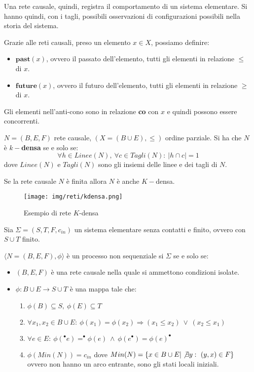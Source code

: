 Una rete causale, quindi, registra il comportamento di un sistema elementare. Si hanno quindi, con i tagli, possibili osservazioni di configurazioni possibili nella storia del sistema.
\begin{definizione}
    Grazie alle reti causali, preso un elemento $x \in X$, possiamo definire:
    \begin{itemize}
        \item $\textbf{past}(x)$, ovvero il passato dell'elemento, tutti gli elementi in relazione $\leq$ di $x$.
        \item $\textbf{future}(x)$, ovvero il futuro dell'elemento, tutti gli elementi in relazione $\geq$ di $x$.
    \end{itemize}
    Gli elementi nell'anti-cono sono in relazione \textbf{co} con $x$ e quindi possono essere concorrenti.
\end{definizione}
\begin{definizione}
    $N = (B, E, F)$ rete causale, $(X = (B \cup E), \leq)$ ordine parziale. Si ha che $N$ è \textbf{$k-$densa} se e solo se:
    \begin{equation}
        \forall h \in Linee(N), \ \forall c \in Tagli(N): \ |h \cap c| = 1 
    \end{equation}
    dove $Linee(N)$ e $Tagli(N)$ sono gli insiemi delle linee e dei tagli di $N$.
\end{definizione}
\begin{nota}
    Se la rete causale $N$ è finita allora $N$ è anche $K-$densa.
\end{nota}
\begin{figure}[!ht]
    \centering
    \texttt{[image: img/reti/kdensa.png]}
    \caption{Esempio di rete $K$-densa}
\end{figure}
\begin{definizione}
    Sia $\Sigma = (S, T, F, c_{in})$ un sistema elementare senza contatti e finito, ovvero con $S \cup T$ finito.

    $\langle N = (B, E, F), \phi \rangle$ è un processo non sequenziale si $\Sigma$ se e solo se:
    \begin{itemize}
        \item $(B, E, F)$ è una rete causale nella quale si ammettono condizioni isolate.
        \item $\phi: B \cup E \to S \cup T$ è una mappa tale che:
        \begin{enumerate}
            \item $\phi(B) \subseteq S, \ \phi(E) \subseteq T$
            \item $\forall x_1, x_2 \in B \cup E: \ \phi(x_1) = \phi(x_2) \Rightarrow (x_1 \leq x_2) \ \lor \ (x_2 \leq x_1)$
            \item $\forall e \in E: \ \phi(^{\bullet}e) = ^{\bullet}\phi(e) \ \land \ \phi(e^{\bullet}) = \phi(e)^{\bullet}$
            \item $\phi(Min(N)) = c_{in}$ dove $Min(N) = \{x \in B \cup E | \not\exists y: \ (y, x) \in F\}$ ovvero non hanno un arco entrante, sono gli stati locali iniziali.
        \end{enumerate}
    \end{itemize}
\end{definizione}
